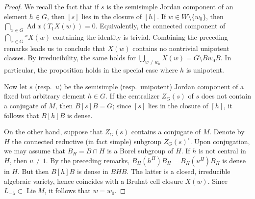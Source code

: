 \documentclass{amsart}
\theoremstyle{plain}
\theoremstyle{definition}
\theoremstyle{remark}
\DeclareMathOperator{\Lie}{Lie}
\begin{document}
\begin{proof}
We recall the fact that if $s$ is the semisimple Jordan component of an element $h \in G$, then $[s]$ lies in the closure of $[h]$.
If $w \in W \setminus \{w_{0}\}$, then $\bigcap_{x \in G} \operatorname{Ad} x (T_{1}X(w)) =
0$. Equivalently, the connected component of $\bigcap_{x \in G} \mbox{}^{x} X(w)$ containing the identity is trivial. Combining the preceding remarks leads us to conclude that
$X(w)$ contains no nontrivial unipotent classes. By irreducibility, the same holds for
$\bigcup_{w \neq w_{0}} X(w) = G \setminus Bw_{0}B$. In particular, the proposition holds
in the special case where $h$ is unipotent.

Now let $s$ (resp.\ $u$) be the semisimple (resp.\ unipotent) Jordan component of a fixed but arbitrary element $h \in G$. If the
centralizer $Z_{G}(s)$ of $s$ does not contain a conjugate of $M$, then $B[s]B = G$;
since $[s]$ lies in the closure of $[h]$, it follows that $B[h]B$ is dense.

On the other hand, suppose that $Z_{G}(s)$ contains a conjugate of $M$. Denote by $H$
the connected reductive (in fact simple) subgroup
$Z_{G}(s)^{\circ}$. Upon
conjugation, we may assume
that $B_{H} = B \cap H$ is a Borel subgroup of $H$. If $h$ is
not central in $H$, then $u
\neq 1$. By the preceding remarks,
$B_{H}(h^{H})B_{H} = B_{H}(u^{H})B_{H}$ is dense in $H$. But then $B[h]B$ is dense in
$BHB$. The latter is a closed, irreducible algebraic variety, hence coincides with a Bruhat cell closure
$X(w)$. Since $L_{-\lambda} \subset \Lie M$, it follows that $w = w_{0}$.
\end{proof}
\end{document}
